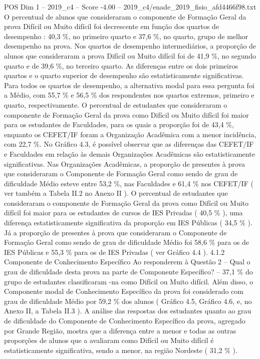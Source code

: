 \begin{textsample}{POS Dim 1 – 2019\_c4 – Score -4.00 – 2019\_c4/enade\_2019\_fisio\_afd4466f98.txt}
O percentual de alunos que consideraram o componente de Formação Geral da prova Difícil ou Muito difícil foi decrescente em função dos quartos de desempenho : 40,3 \%, no primeiro quarto e 37,6 \%, no quarto, grupo de melhor desempenho na prova.
Nos quartos de desempenho intermediários, a proporção de alunos que consideraram a prova Difícil ou Muito difícil foi de 41,9 \%, no segundo quarto e de 39,6 \%, no terceiro quarto.
As diferenças entre os dois primeiros quartos e o quarto superior de desempenho são estatisticamente significativas.
Para todos os quartos de desempenho, a alternativa modal para essa pergunta foi a Médio, com 55,7 \% e 56,5 \% dos respondentes nos quartos extremos, primeiro e quarto, respectivamente.
O percentual de estudantes que consideraram o componente de Formação Geral da prova como Difícil ou Muito difícil foi maior para os estudantes de Faculdades, para os quais a proporção foi de 43,4 \%, enquanto os CEFET/IF foram a Organização Acadêmica com a menor incidência, com 22,7 \%.
No Gráfico 4.3, é possível observar que as diferenças das CEFET/IF e Faculdades em relação às demais Organizações Acadêmicas são estatisticamente significativas.
Nas Organizações Acadêmicas, a proporção de presentes à prova que consideraram o Componente de Formação Geral como sendo de grau de dificuldade Médio esteve entre 53,2 \%, nas Faculdades e 61,4 \% nos CEFET/IF ( ver também a Tabela II.2 no Anexo II ).
O percentual de estudantes que consideraram o componente de Formação Geral da prova como Difícil ou Muito difícil foi maior para os estudantes de cursos de IES Privadas ( 40,5 \% ), uma diferença estatisticamente significativa da proporção em IES Públicas ( 34,5 \% ).
Já a proporção de presentes à prova que consideraram o Componente de Formação Geral como sendo de grau de dificuldade Médio foi 58,6 \% para os de IES Públicas e 55,3 \% para os de IES Privadas ( ver Gráfico 4.4 ). 4.1.2 Componente de Conhecimento Específico Ao responderem à Questão 2 – Qual o grau de dificuldade desta prova na parte de Componente Específico? – 37,1 \% do grupo de estudantes classificaram -na como Difícil ou Muito difícil.
Além disso, o Componente modal de Conhecimento Específico da prova foi considerado com grau de dificuldade Médio por 59,2 \% dos alunos ( Gráfico 4.5, Gráfico 4.6, e, no Anexo II, a Tabela II.3 ).
A análise das respostas dos estudantes quanto ao grau de dificuldade do Componente de Conhecimento Específico da prova, agregado por Grande Região, mostra que a diferença entre a menor e todas as outras proporções de alunos que a avaliaram como Difícil ou Muito difícil é estatisticamente significativa, sendo a menor, na região Nordeste ( 31,2 \% ).

\end{textsample}
